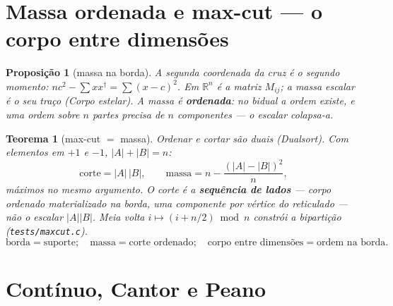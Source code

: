 \documentclass[11pt,a4paper]{article}
\newtheorem{teorema}{Teorema}
\newtheorem{proposicao}{Proposição}
\newcommand{\code}[1]{\texttt{#1}}
\begin{document}
\section{Massa ordenada e max-cut --- o corpo entre dimensões}

\begin{proposicao}[massa na borda]\label{prop:massa}
A segunda coordenada da cruz é o segundo momento:
$nc^{2}-\sum xx^{\dagger}=\sum(x-c)^{2}$. Em $\mathbb{R}^{n}$ é a
matriz $M_{ij}$; a massa escalar é o seu traço
(\emph{Corpo estelar}). A massa é \textbf{ordenada}: no bidual a ordem
existe, e uma ordem sobre $n$ partes precisa de $n$ componentes --- o
escalar colapsa-a.
\end{proposicao}

\begin{teorema}[max-cut $=$ massa]\label{thm:maxcut}
Ordenar e cortar são duais (\emph{Dualsort}). Com elementos em
$+1$ e $-1$, $|A|+|B|=n$:
\[
\mathrm{corte}=|A|\,|B|,
\qquad
\mathrm{massa}=n-\frac{(|A|-|B|)^{2}}{n},
\]
máximos no mesmo argumento. O corte é a \textbf{sequência de lados}
--- corpo ordenado materializado na borda, uma componente por vértice
do reticulado --- não o escalar $|A||B|$. Meia volta
$i\mapsto(i+n/2)\bmod n$ constrói a bipartição
(\code{tests/maxcut.c}).
\[
\boxed{
\text{borda}=\text{suporte};\quad
\text{massa}=\text{corte ordenado};\quad
\text{corpo entre dimensões}=\text{ordem na borda}.
}
\]
\end{teorema}

\section{Contínuo, Cantor e Peano}
\end{document}
